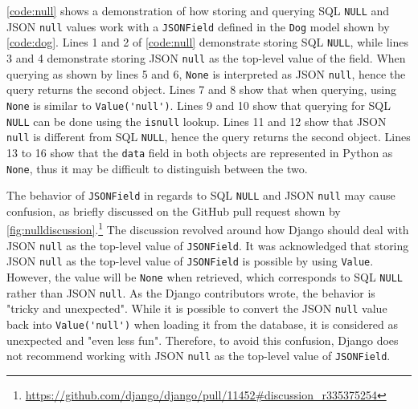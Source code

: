 \autoref{code:null} shows a demonstration of how storing and querying SQL
\verb|NULL| and JSON \verb|null| values work with a \verb|JSONField| defined in
the \verb|Dog| model shown by \autoref{code:dog}. Lines 1 and 2 of
\autoref{code:null} demonstrate storing SQL \verb|NULL|, while lines 3 and 4
demonstrate storing JSON \verb|null| as the top-level value of the field. When
querying as shown by lines 5 and 6, \verb|None| is interpreted as JSON
\verb|null|, hence the query returns the second object. Lines 7 and 8 show that
when querying, using \verb|None| is similar to \verb|Value('null')|. Lines 9
and 10 show that querying for SQL \verb|NULL| can be done using the
\verb|isnull| lookup. Lines 11 and 12 show that JSON \verb|null| is different
from SQL \verb|NULL|, hence the query returns the second object. Lines 13 to 16
show that the \verb|data| field in both objects are represented in Python as
\verb|None|, thus it may be difficult to distinguish between the two.

The behavior of \verb|JSONField| in regards to SQL \verb|NULL| and JSON
\verb|null| may cause confusion, as briefly discussed on the GitHub pull
request shown by
\autoref{fig:nulldiscussion}.\footnote{\url{
	https://github.com/django/django/pull/11452\#discussion\_r335375254}}
The discussion revolved around how Django should deal with JSON \verb|null| as
the top-level value of \verb|JSONField|. It was acknowledged that storing JSON
\verb|null| as the top-level value of \verb|JSONField| is possible by using
\verb|Value|. However, the value will be \verb|None| when retrieved, which
corresponds to SQL \verb|NULL| rather than JSON \verb|null|. As the Django
contributors wrote, the behavior is "tricky and unexpected". While it is
possible to convert the JSON \verb|null| value back into \verb|Value('null')|
when loading it from the database, it is considered as unexpected and "even
less fun". Therefore, to avoid this confusion, Django does not recommend
working with JSON \verb|null| as the top-level value of \verb|JSONField|.

